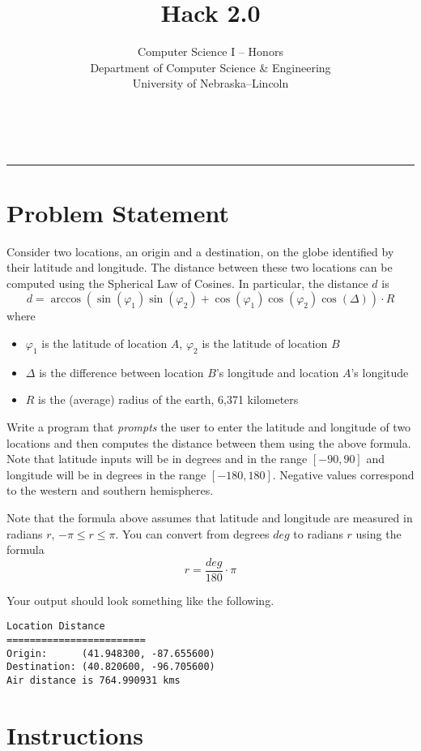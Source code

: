\documentclass[12pt]{scrartcl}
\title{Hack 2.0}\let\Title\@title
\subtitle{Computer Science I -- Honors\\
{\small
\vskip1cm
Department of Computer Science \& Engineering \\
University of Nebraska--Lincoln}
\vskip-1cm}
\date{~}
\begin{document}
\maketitle

\hrule



\section*{Problem Statement}

Consider two locations, an origin and a destination, on the globe 
identified by their latitude and longitude.  The distance between
these two locations can be computed using the Spherical Law of 
Cosines.  In particular, the distance $d$ is
 $$d = \arccos{(\sin(\varphi_1) \sin(\varphi_2) + \cos(\varphi_1) \cos(\varphi_2) \cos(\Delta) )} \cdot R$$
where
\begin{itemize}
  \item $\varphi_1$ is the latitude of location $A$, $\varphi_2$ is the latitude of location $B$
  \item $\Delta$ is the difference between location $B$'s longitude and location $A$'s longitude
  \item $R$ is the (average) radius of the earth, 6,371 kilometers
\end{itemize}

Write a program that \emph{prompts} the user to enter the latitude 
and longitude of two locations and then computes the distance between them using
the above formula.  Note that latitude inputs will be in degrees and in the
range $[-90, 90]$ and longitude will be in degrees in the range $[-180, 180]$.
Negative values correspond to the western and southern hemispheres.  

Note that the formula above assumes that latitude and longitude are 
measured in radians $r$, $-\pi \leq r \leq \pi$.  You can convert from
degrees $deg$ to radians $r$ using the formula
  $$r = \frac{deg}{180} \cdot \pi$$  

Your output should look something like the following.  

\begin{verbatim}
Location Distance
========================
Origin:      (41.948300, -87.655600)
Destination: (40.820600, -96.705600)
Air distance is 764.990931 kms
\end{verbatim}


\section*{Instructions}
\end{document}
